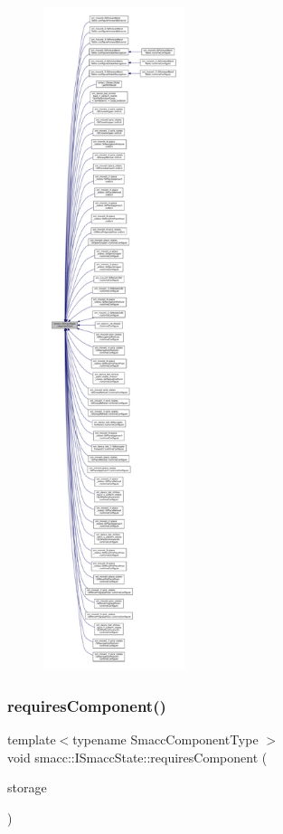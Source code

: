 \begin{figure}[H]
\begin{center}
\leavevmode
\includegraphics[height=550pt]{classsmacc_1_1ISmaccState_a7f95c9f0a6ea2d6f18d1aec0519de4ac_icgraph}
\end{center}
\end{figure}
\mbox{\label{classsmacc_1_1ISmaccState_afd5264c36403d22e124eea89a0122e59}} 
\subsubsection{\texorpdfstring{requires\+Component()}{requiresComponent()}}
{\footnotesize\ttfamily template$<$typename Smacc\+Component\+Type $>$ \\
void smacc\+::\+I\+Smacc\+State\+::requires\+Component (\begin{DoxyParamCaption}\item[{Smacc\+Component\+Type $\ast$\&}]{storage }\end{DoxyParamCaption})}



